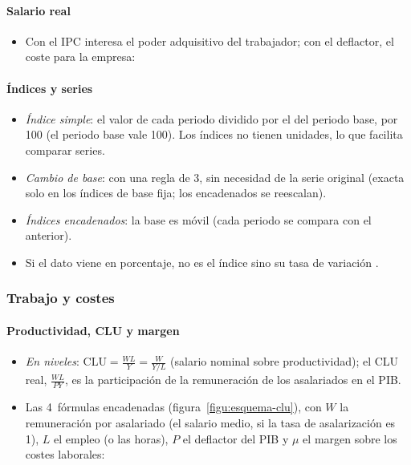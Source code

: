 \documentclass[11pt]{article}
\begin{document}
\paragraph{Salario real}
\begin{itemize}
\item Con el IPC interesa el poder adquisitivo del trabajador; con el deflactor, el coste para la empresa:
\end{itemize}

\paragraph{Índices y series}
\begin{itemize}
\item \emph{Índice simple}: el valor de cada periodo dividido por el del periodo base, por 100 (el periodo base vale 100). Los índices no tienen unidades, lo que facilita comparar series.
\item \emph{Cambio de base}: con una regla de 3, sin necesidad de la serie original (exacta solo en los índices de base fija; los encadenados se reescalan).
\item \emph{Índices encadenados}: la base es móvil (cada periodo se compara con el anterior).
\item Si el dato viene en porcentaje, no es el índice sino su tasa de variación .
\end{itemize}

\subsubsection{Trabajo y costes}\label{anexo:calc-trabajo}

\paragraph{Productividad, CLU y margen}
\begin{itemize}
\item \emph{En niveles}: $\mathrm{CLU}=\frac{WL}{Y}=\frac{W}{Y/L}$ (salario nominal sobre productividad); el CLU real, $\frac{WL}{PY}$, es la participación de la remuneración de los asalariados en el PIB.
\item Las 4~fórmulas encadenadas (figura~\ref{figu:esquema-clu}), con $W$ la remuneración por asalariado (el salario medio, si la tasa de asalarización es 1), $L$ el empleo (o las horas), $P$ el deflactor del PIB y $\mu$ el margen sobre los costes laborales:
\end{itemize}
\end{document}
